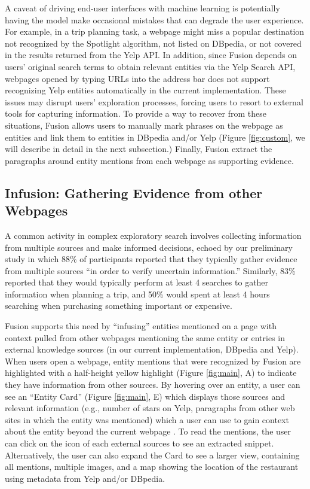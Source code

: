 A caveat of driving end-user interfaces with machine learning is potentially having the model make occasional mistakes that can degrade the user experience. For example, in a trip planning task, a webpage might miss a popular destination not recognized by the Spotlight algorithm, not listed on DBpedia, or not covered in the results returned from the Yelp API. In addition, since Fusion depends on users' original search terms to obtain relevant entities via the Yelp Search API, webpages opened by typing URLs into the address bar does not support recognizing Yelp entities automatically in the current implementation. These issues may disrupt users' exploration processes, forcing users to resort to external tools for capturing information. To provide a way to recover from these situations, Fusion allows users to manually mark phrases on the webpage as entities and link them to entities in DBpedia and/or Yelp (Figure \ref{fig:custom}, we will describe in detail in the next subsection.) Finally, Fusion extract the paragraphs around entity mentions from each webpage as supporting evidence.

\subsection{Infusion: Gathering Evidence from other Webpages}

A common activity in complex exploratory search involves collecting information from multiple sources and make informed decisions, echoed by our preliminary study in which 88\% of participants reported that they typically gather evidence from multiple sources ``in order to verify uncertain information.'' Similarly, 83\% reported that they would typically perform at least 4 searches to gather information when planning a trip, and 50\% would spent at least 4 hours searching when purchasing something important or expensive.

Fusion supports this need by ``infusing'' entities mentioned on a page with context pulled from other webpages mentioning the same entity or entries in external knowledge sources (in our current implementation, DBpedia and Yelp). When users open a webpage, entity mentions that were recognized by Fusion are highlighted with a half-height yellow highlight (Figure \ref{fig:main}, A) to indicate they have information from other sources. By hovering over an entity, a user can see an ``Entity Card'' (Figure \ref{fig:main}, E) which displays those sources and relevant information (e.g., number of stars on Yelp, paragraphs from other web sites in which the entity was mentioned) which a user can use to gain context about the entity beyond the current webpage \cite{bota}. To read the mentions, the user can click on the icon of each external sources to see an extracted snippet. Alternatively, the user can also expand the Card to see a larger view, containing all mentions, multiple images, and a map showing the location of the restaurant using metadata from Yelp and/or DBpedia. 

